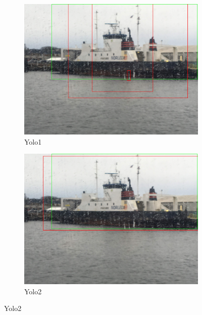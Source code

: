 \begin{figure}[h!]
\begin{subfigure}{.5\textwidth}
  \centering
  \includegraphics[width=0.8\linewidth]{results/case_tr_moor/yolo12/yolo1/2better/IMG_2574.jpg}
  \caption{Yolo1}
\end{subfigure}%
\begin{subfigure}{.5\textwidth}
  \centering
  \includegraphics[width=.8\linewidth]{results/case_tr_moor/yolo12/yolo2/2better/IMG_2574.jpg}
  \caption{Yolo2}
\end{subfigure}


\end{figure}

